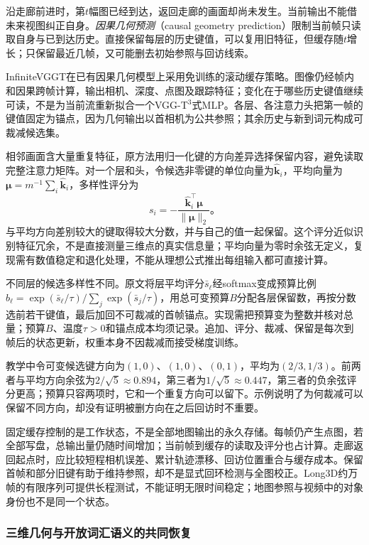 沿走廊前进时，第$t$幅图已经到达，返回走廊的画面却尚未发生。当前输出不能借未来视图纠正自身。\emph{因果几何预测}（causal geometry prediction）限制当前帧只读取自身与已到达历史。直接保留每层的历史键值，可以复用旧特征，但缓存随$t$增长；只保留最近几帧，又可能删去初始参照与回访线索。

InfiniteVGGT在已有因果几何模型上采用免训练的滚动缓存策略。图像仍经帧内和因果跨帧计算，输出相机、深度、点图及跟踪特征；变化在于哪些历史键值继续可读，不是为当前流重新拟合一个VGG-T$^3$式MLP。各层、各注意力头把第一帧的键值固定为锚点，因为几何输出以首相机为公共参照；其余历史与新到词元构成可裁减候选集。

相邻画面含大量重复特征，原方法用归一化键的方向差异选择保留内容，避免读取完整注意力矩阵。对一个层和头，令候选非零键的单位向量为$\hat{\bm{k}}_i$，平均向量为$\bm{\mu}=m^{-1}\sum_i\hat{\bm{k}}_i$，多样性评分为
\begin{equation}
 s_i=-\frac{\hat{\bm{k}}_i^\top\bm{\mu}}
                 {\lVert\bm{\mu}\rVert_2}\text{。}
 \label{eq:vision-infinitevggt-diversity}
\end{equation}
与平均方向差别较大的键取得较大分数，并与自己的值一起保留。这个评分近似识别特征冗余，不是直接测量三维点的真实信息量；平均向量为零时余弦无定义，复现需有数值稳定和退化处理，不能从理想公式推出每组输入都可直接计算。

不同层的候选多样性不同。原文将层平均评分$\bar s_\ell$经softmax变成预算比例$b_\ell=\exp(\bar s_\ell/\tau)/\sum_j\exp(\bar s_j/\tau)$，用总可变预算$B$分配各层保留数，再按分数选前若干键值，最后加回不可裁减的首帧锚点。实现需把预算变为整数并核对总量；预算$B$、温度$\tau>0$和锚点成本均须记录。追加、评分、裁减、保留是每次到帧后的状态更新，权重本身不因裁减而接受梯度训练。

教学中令可变候选键方向为$(1,0)$、$(1,0)$、$(0,1)$，平均为$(2/3,1/3)$。前两者与平均方向余弦为$2/\sqrt5\approx0.894$，第三者为$1/\sqrt5\approx0.447$，第三者的负余弦评分更高；预算只容两项时，它和一个重复方向可以留下。示例说明了为何裁减可以保留不同方向，却没有证明被删方向在之后回访时不重要。

固定缓存控制的是工作状态，不是全部地图输出的永久存储。每帧仍产生点图，若全部写盘，总输出量仍随时间增加；当前帧到缓存的读取及评分也占计算。走廊返回起点时，应比较短程相机误差、累计轨迹漂移、回访位置重合与缓存成本。保留首帧和部分旧键有助于维持参照，却不是显式回环检测与全图校正。Long3D约万帧的有限序列可提供长程测试，不能证明无限时间稳定；地图参照与视频中的对象身份也不是同一个状态。

\subsubsection{三维几何与开放词汇语义的共同恢复}
\label{sec:vision-recognition-ff3r}

